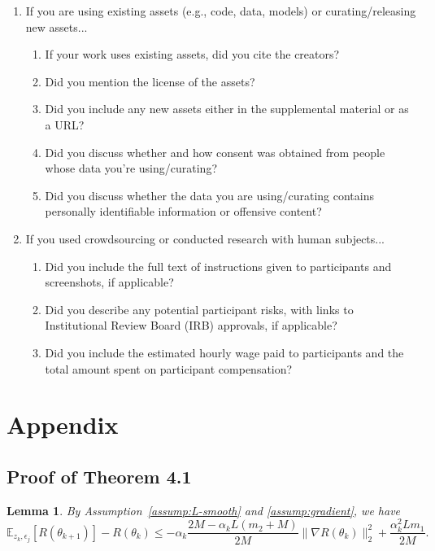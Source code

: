 \documentclass{article}
\newtheorem{lemma}{Lemma}[section]
\begin{document}
\begin{enumerate}
\item If you are using existing assets (e.g., code, data, models) or curating/releasing new assets...
\begin{enumerate}
  \item If your work uses existing assets, did you cite the creators?
  \item Did you mention the license of the assets?
    \answerNA{}
  \item Did you include any new assets either in the supplemental material or as a URL?
    \answerNA{}
  \item Did you discuss whether and how consent was obtained from people whose data you're using/curating?
    \answerNA{}
  \item Did you discuss whether the data you are using/curating contains personally identifiable information or offensive content?
    \answerNA{}
\end{enumerate}

\item If you used crowdsourcing or conducted research with human subjects...
\begin{enumerate}
  \item Did you include the full text of instructions given to participants and screenshots, if applicable?
    \answerNA{}
  \item Did you describe any potential participant risks, with links to Institutional Review Board (IRB) approvals, if applicable?
    \answerNA{}
  \item Did you include the estimated hourly wage paid to participants and the total amount spent on participant compensation?
    \answerNA{}
\end{enumerate}

\end{enumerate}

\newpage

\appendix
\section{Appendix}
\subsection{Proof of Theorem 4.1} \label{appendix:proof}
\begin{lemma}\label{lemma:pre}
By Assumption~\ref{assump:L-smooth} and \ref{assump:gradient}, we have
\begin{equation}\label{eq:lemma}
    \mathbb{E}_{z_k,\epsilon_{j}}[R(\theta_{k+1})] - R(\theta_k) \leq -\alpha_k\frac{2M-\alpha_k L(m_2+M)}{2M}\|\nabla R(\theta_k)\|_2^2  + \frac{\alpha_k^2L m_1}{2M}.
\end{equation}
\end{lemma}
\end{document}

